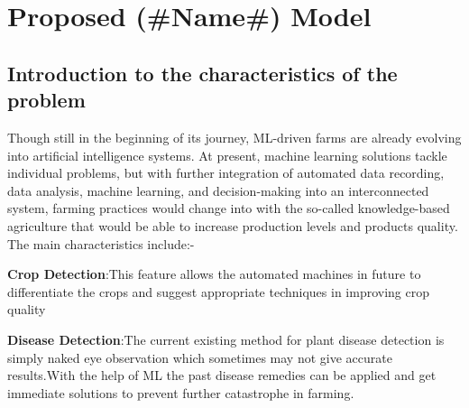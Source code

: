\documentclass[../Report.tex]{subfiles}
\begin{document}
\chapter{Proposed (\#Name\#) Model}

\section{Introduction to the characteristics of the problem}
Though still in the beginning of its journey, ML-driven farms are already evolving into artificial intelligence systems.
At present, machine learning solutions tackle individual problems, but with further integration of automated data recording,
data analysis, machine learning, and decision-making into an interconnected system, farming practices would change into with
the so-called knowledge-based agriculture that would be able to increase production levels and products quality.
The main characteristics include:-\par
\textbf{Crop Detection}:This feature allows the automated machines in future to differentiate the crops and suggest appropriate 
  techniques in improving crop quality\par
\textbf{Disease Detection}:The current existing method for plant disease detection is simply naked eye observation which sometimes may not 
  give accurate results.With the help of ML the past disease remedies can be applied  and get immediate solutions to prevent further catastrophe
  in farming.
\end{document}
